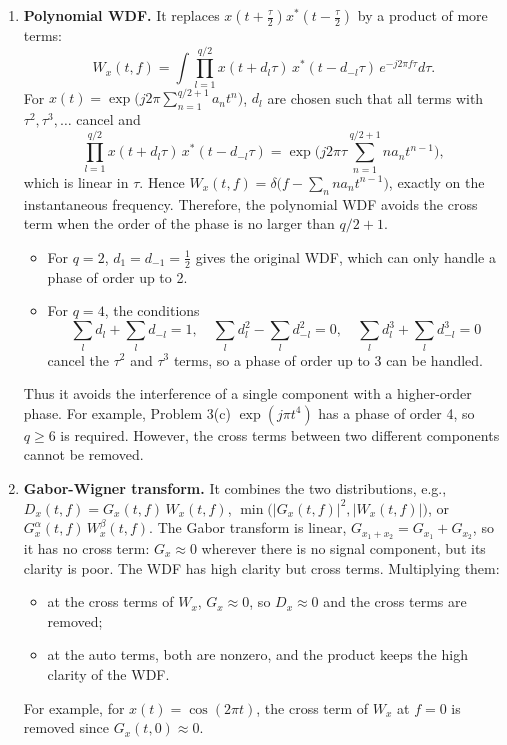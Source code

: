 \documentclass[12pt,a4paper]{article}
\begin{document}
\begin{enumerate}
\begin{enumerate}[label=(\alph*)]
  \item \textbf{Polynomial WDF.} It replaces $x(t+\frac\tau2)x^*(t-\frac\tau2)$ by a product of more terms:
  \[
  W_x(t,f)=\int\prod_{l=1}^{q/2}x(t+d_l\tau)\,x^*(t-d_{-l}\tau)\,e^{-j2\pi f\tau}d\tau .
  \]
  For $x(t)=\exp\!\big(j2\pi\sum_{n=1}^{q/2+1}a_nt^n\big)$, $d_l$ are chosen such that all terms with $\tau^2,\tau^3,\ldots$ cancel and
  \[
  \prod_{l=1}^{q/2}x(t+d_l\tau)\,x^*(t-d_{-l}\tau)=\exp\!\Big(j2\pi\tau\sum_{n=1}^{q/2+1} na_nt^{n-1}\Big),
  \]
  which is linear in $\tau$. Hence $W_x(t,f)=\delta\big(f-\sum_n na_nt^{n-1}\big)$, exactly on the instantaneous frequency. Therefore, the polynomial WDF avoids the cross term when the order of the phase is no larger than $q/2+1$.
  \begin{itemize}
    \item For $q=2$, $d_1=d_{-1}=\frac12$ gives the original WDF, which can only handle a phase of order up to 2.
    \item For $q=4$, the conditions
    \[
    \textstyle\sum_l d_l+\sum_l d_{-l}=1,\quad \sum_l d_l^2-\sum_l d_{-l}^2=0,\quad \sum_l d_l^3+\sum_l d_{-l}^3=0
    \]
    cancel the $\tau^2$ and $\tau^3$ terms, so a phase of order up to 3 can be handled.
  \end{itemize}
  Thus it avoids the interference of a single component with a higher-order phase. For example, Problem 3(c) $\exp(j\pi t^4)$ has a phase of order 4, so $q\ge 6$ is required. However, the cross terms between two different components cannot be removed.

  \item \textbf{Gabor-Wigner transform.} It combines the two distributions, e.g., $D_x(t,f)=G_x(t,f)\,W_x(t,f)$, $\min\!\big(|G_x(t,f)|^2,|W_x(t,f)|\big)$, or $G_x^\alpha(t,f)\,W_x^\beta(t,f)$. The Gabor transform is linear, $G_{x_1+x_2}=G_{x_1}+G_{x_2}$, so it has no cross term: $G_x\approx0$ wherever there is no signal component, but its clarity is poor. The WDF has high clarity but cross terms. Multiplying them:
  \begin{itemize}
    \item at the cross terms of $W_x$, $G_x\approx0$, so $D_x\approx0$ and the cross terms are removed;
    \item at the auto terms, both are nonzero, and the product keeps the high clarity of the WDF.
  \end{itemize}
  For example, for $x(t)=\cos(2\pi t)$, the cross term of $W_x$ at $f=0$ is removed since $G_x(t,0)\approx0$.
\end{enumerate}



\end{enumerate}
\end{document}

